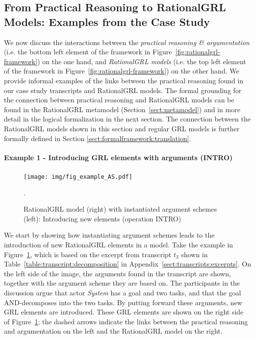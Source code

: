\subsection{From Practical Reasoning to RationalGRL Models: Examples from the Case Study}
\label{sect:overview:examples}

We now discuss the interactions between the \emph{practical reasoning \& argumentation} (i.e. the bottom left element of the framework in Figure~\ref{fig:rationalgrl-framework}) on the one hand, and \emph{RationalGRL models} (i.e. the top left element of the framework in Figure~\ref{fig:rationalgrl-framework}) on the other hand. We provide informal examples of the links between the practical reasoning found in our case study transcripts and RationalGRL models. The formal grounding for the connection between practical reasoning and RationalGRL models can be found in the RationalGRL metamodel (Section~\ref{sect:metamodel}) and in more detail in the logical formalization in the next section. The connection between the RationalGRL models shown in this section and regular GRL models is further formally defined in Section \ref{sect:formalframework:translation}. 

\paragraph{Example 1 - Introducing GRL elements with arguments (\textsf{INTRO)}}

\begin{figure}[t]
\centering
\texttt{[image: img/fig\_example\_AS.pdf]}
\caption{RationalGRL model (right) with instantiated argument schemes (left): Introducing new elements (operation \textsf{INTRO)}}. 
\label{fig:example_AS}
\end{figure}

We start by showing how instantiating argument schemes leads to the introduction of new RationalGRL elements in a model. Take the example in Figure~\ref{fig:example_AS}, which is based on the excerpt from transcript $t_3$ shown in Table~\ref{table:transcript:decomposition} in Appendix~\ref{sect:transcripts:excerpts}. On the left side of the image, the arguments found in the transcript are shown, together with the argument scheme they are based on. The participants in the discussion argue that actor \emph{System} has a goal and two tasks, and that the goal AND-decomposes into the two tasks. By putting forward these arguments, new GRL elements are introduced. These GRL elements are shown on the right side of Figure~\ref{fig:example_AS}; the dashed arrows indicate the links between the practical reasoning and argumentation on the left and the RationalGRL model on the right.



